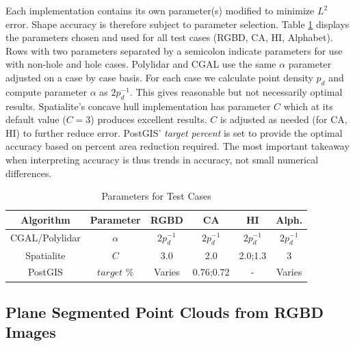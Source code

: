 Each implementation contains its own parameter(s) modified to minimize $L^2$ error. Shape accuracy is therefore subject to parameter selection. Table \ref{table:ch2_params} displays the parameters chosen and used for all test cases (RGBD, CA, HI, Alphabet). Rows with two parameters separated by a semicolon indicate parameters for use with non-hole and hole cases.  Polylidar and CGAL use the same $\alpha$ parameter adjusted on a case by case basis. For each case we calculate point density $p_d$ and compute parameter $\alpha$ as $2p^{-1}_d$.  This gives reasonable but not necessarily optimal results.  Spatialite's concave hull implementation has  parameter $C$ which at its default value ($C=3$) produces excellent results. $C$ is adjusted as needed (for CA, HI) to further reduce error.  PostGIS' \emph{target percent} is set to provide the optimal accuracy based on  percent area reduction required. The most important takeaway when interpreting accuracy is thus trends in accuracy, not small numerical differences.


\begin{table}[ht]
\centering
\caption{Parameters for Test Cases}
\label{table:ch2_params}
\begin{tabular}{@{}cccccc@{}}
\toprule
Algorithm      & Parameter     & RGBD &       CA          & HI  &  Alph.                  \\ \midrule
CGAL/Polylidar & $\alpha$           & $2p^{-1}_d$  &$2p^{-1}_d$ & $2p^{-1}_d$ & $2p^{-1}_d$   \\ \addlinespace[1mm]
Spatialite     & $C$                & 3.0  &            2.0           & 2.0;1.3 & 3           \\
\addlinespace[1mm]
PostGIS        & $target$ \%  & Varies     & 0.76;0.72   & -         & Varies  \\ \bottomrule
\end{tabular}
\end{table}


\subsection{Plane Segmented Point Clouds from RGBD Images}\label{sec:ch2_rgbd}

